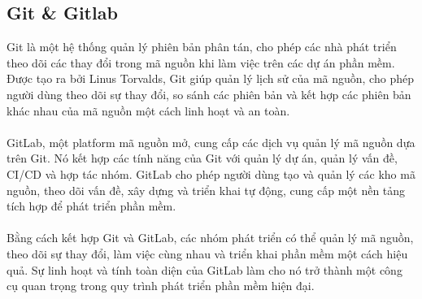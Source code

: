 \subsection{Git \& Gitlab}
Git là một hệ thống quản lý phiên bản phân tán, cho phép các nhà phát triển theo dõi các thay đổi trong mã nguồn khi làm việc trên các dự án phần mềm. Được tạo ra bởi Linus Torvalds, Git giúp quản lý lịch sử của mã nguồn, cho phép người dùng theo dõi sự thay đổi, so sánh các phiên bản và kết hợp các phiên bản khác nhau của mã nguồn một cách linh hoạt và an toàn.\\
\\
GitLab, một platform mã nguồn mở, cung cấp các dịch vụ quản lý mã nguồn dựa trên Git. Nó kết hợp các tính năng của Git với quản lý dự án, quản lý vấn đề, CI/CD và hợp tác nhóm. GitLab cho phép người dùng tạo và quản lý các kho mã nguồn, theo dõi vấn đề, xây dựng và triển khai tự động, cung cấp một nền tảng tích hợp để phát triển phần mềm.\\
\\
Bằng cách kết hợp Git và GitLab, các nhóm phát triển có thể quản lý mã nguồn, theo dõi sự thay đổi, làm việc cùng nhau và triển khai phần mềm một cách hiệu quả. Sự linh hoạt và tính toàn diện của GitLab làm cho nó trở thành một công cụ quan trọng trong quy trình phát triển phần mềm hiện đại.
